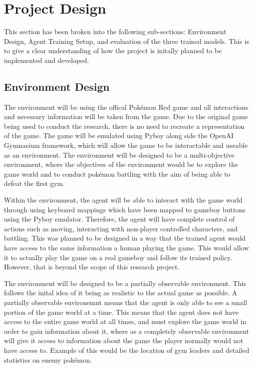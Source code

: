 \section{Project Design}

This section has been broken into the following sub-sections: Environment Design, Agent Training Setup, and evaluation of the three trained models. This is to give a clear understanding of how the project is initally planned to be implemented and developed.

\subsection{Environment Design}

The environment will be using the offical Pokémon Red game and all interactions and necessary information will be taken from the game. Due to the original game being used to conduct the research, there is no need to recreate a representation of the game. The game will be emulated using Pyboy along side the OpenAI Gymnasium framework, which will allow the game to be interactable and useable as an environment. The environment will be designed to be a multi-objective environment, where the objectives of the environment would be to explore the game world and to conduct pokémon battling with the aim of being able to defeat the first gym. 

Within the environment, the agent will be able to interact with the game world through using keyboard mappings which have been mapped to gameboy buttons using the Pyboy emulator. Therefore, the agent will have complete control of actions such as moving, interacting with non-player controlled characters, and battling. This was planned to be designed in a way that the trained agent would have access to the same information a human playing the game. This would allow it to actually play the game on a real gameboy and follow its trained policy. However, that is beyond the scope of this research project.

The environment will be designed to be a partially observable environment. This follows the inital idea of it being as realistic to the actual game as possible. A partially observable environemnt means that the agent is only able to see a small portion of the game world at a time. This means that the agent does not have access to the entire game world at all times, and must explore the game world in order to gain information about it, where as a completely observable environment will give it access to information about the game the player normally would not have access to. Example of this would be the location of gym leaders and detailed statistics on enemy pokémon. 

